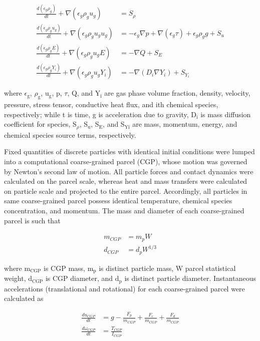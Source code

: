 \documentclass{article}
\begin{document}
\begin{align}
    \frac{d(\epsilon_g \rho_g)}{dt} + \nabla (\epsilon_g \rho_g u_g) &= S_\rho \label{eq:gas-trans-mass} \\
    \frac{d(\epsilon_g \rho_g u_g)}{dt} + \nabla (\epsilon_g \rho_g u_g u_g) &= -\epsilon_g \nabla p + \nabla (\epsilon_g \tau) + \epsilon_g \rho_g g + S_u \\
    \frac{d(\epsilon_g \rho_g E)}{dt} + \nabla (\epsilon_g \rho_g u_g E) &= -\nabla Q + S_E \\
    \frac{d(\epsilon_g \rho_g Y_i)}{dt} + \nabla (\epsilon_g \rho_g u_g Y_i) &= -\nabla (D_i \nabla Y_i) + S_{Y_i} \label{eq:gas-trans-chemical}
\end{align}

\noindent where $\epsilon_\text{g}$, $\rho_\text{g}$, u$_\text{g}$, p, $\tau$, Q, and Y$_\text{i}$ are gas phase volume fraction, density, velocity, pressure, stress tensor, conductive heat flux, and ith chemical species, respectively; while t is time, g is acceleration due to gravity, D$_\text{i}$ is mass diffusion coefficient for species, S$_\rho$, S$_\text{u}$, S$_\text{E}$, and S$_\text{Yi}$ are mass, momentum, energy, and chemical species source terms, respectively.

Fixed quantities of discrete particles with identical initial conditions were lumped into a computational coarse-grained parcel (CGP), whose motion was governed by Newton’s second law of motion. All particle forces and contact dynamics were calculated on the parcel scale, whereas heat and mass transfers were calculated on particle scale and projected to the entire parcel. Accordingly, all particles in same coarse-grained parcel possess identical temperature, chemical species concentration, and momentum. The mass and diameter of each coarse-grained parcel is such that

\begin{align}
    m_{CGP} &= m_p W \\
    d_{CGP} &= d_p W^{1/3}
\end{align}

\noindent where m$_\text{CGP}$ is CGP mass, m$_\text{p}$ is distinct particle mass, W parcel statistical weight, d$_\text{CGP}$ is CGP diameter, and d$_\text{p}$ is distinct particle diameter. Instantaneous accelerations (translational and rotational) for each coarse-grained parcel were calculated as

\begin{align}
    \frac{d u_{CGP}}{dt} &= g - \frac{F_p}{m_{CGP}} + \frac{F_c}{m_{CGP}} + \frac{F_d}{m_{CGP}} \\
    \frac{d \omega_{CGP}}{dt} &= \frac{T_{CGP}}{I_{CGP}}
\end{align}
\end{document}
